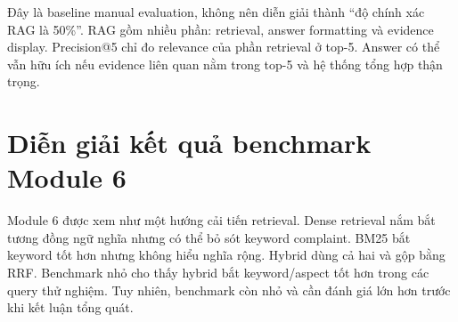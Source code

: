 Đây là baseline manual evaluation, không nên diễn giải thành “độ chính xác RAG là 50\%”. RAG gồm nhiều phần: retrieval, answer formatting và evidence display. Precision@5 chỉ đo relevance của phần retrieval ở top-5. Answer có thể vẫn hữu ích nếu evidence liên quan nằm trong top-5 và hệ thống tổng hợp thận trọng.

\section{Diễn giải kết quả benchmark Module 6}
Module 6 được xem như một hướng cải tiến retrieval. Dense retrieval nắm bắt tương đồng ngữ nghĩa nhưng có thể bỏ sót keyword complaint. BM25 bắt keyword tốt hơn nhưng không hiểu nghĩa rộng. Hybrid dùng cả hai và gộp bằng RRF. Benchmark nhỏ cho thấy hybrid bắt keyword/aspect tốt hơn trong các query thử nghiệm. Tuy nhiên, benchmark còn nhỏ và cần đánh giá lớn hơn trước khi kết luận tổng quát.

